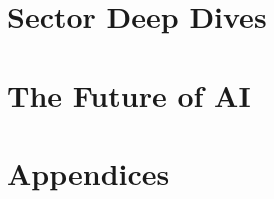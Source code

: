 \documentclass{book}
\begin{document}
\part{Sector Deep Dives}










\part{The Future of AI}


\appendix
\part{Appendices}


\backmatter
\printbibliography
\end{document}
